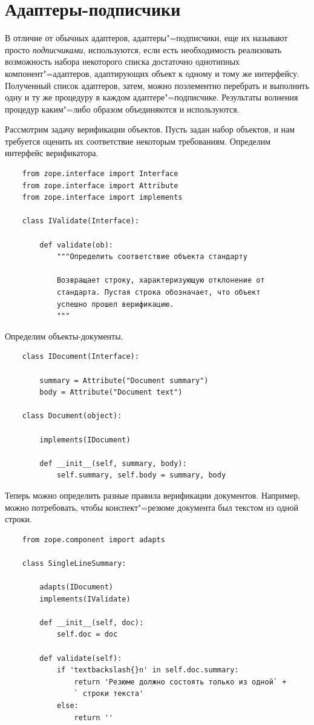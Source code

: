 \documentclass[a4paper,openany,twoside,draft]{book}
\providecommand*{\DUroletitlereference}[1]{\textsl{#1}}
\begin{document}
\section{Адаптеры-подписчики%
  \label{id46}%
}

В отличие от обычных адаптеров, адаптеры"=подписчики, еще их называют просто \DUroletitlereference{подписчиками}, используются, если есть необходимость реализовать возможность набора некоторого списка достаточно однотипных компонент"=адаптеров, адаптирующих объект к одному и тому же интерфейсу.  Полученный список адаптеров, затем, можно поэлементно перебрать и выполнить одну и ту же процедуру в каждом адаптере"=подписчике.  Результаты волнения процедур каким"=либо образом объединяются и используются.

Рассмотрим задачу верификации объектов.  Пусть задан набор объектов, и нам требуется оценить их соответствие некоторым требованиям.  Определим интерфейс верификатора.

\begin{verbatim}
    from zope.interface import Interface
    from zope.interface import Attribute
    from zope.interface import implements

    class IValidate(Interface):

        def validate(ob):
            """Определить соответствие объекта стандарту

            Возвращает строку, характеризующую отклонение от
            стандарта. Пустая строка обозначает, что объект
            успешно прошел верификацию.
            """
\end{verbatim}

Определим объекты-документы.

\begin{verbatim}
    class IDocument(Interface):

        summary = Attribute("Document summary")
        body = Attribute("Document text")

    class Document(object):

        implements(IDocument)

        def __init__(self, summary, body):
            self.summary, self.body = summary, body
\end{verbatim}

Теперь можно определить разные правила верификации документов.  Например, можно потребовать, чтобы конспект"=резюме документа был текстом из одной строки.

\begin{verbatim}
    from zope.component import adapts

    class SingleLineSummary:

        adapts(IDocument)
        implements(IValidate)

        def __init__(self, doc):
            self.doc = doc

        def validate(self):
            if 'textbackslash{}n' in self.doc.summary:
                return 'Резюме должно состоять только из одной` +
                ` строки текста'
            else:
                return ''
\end{verbatim}
\end{document}

